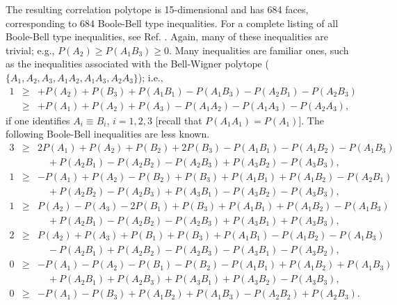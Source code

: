 The resulting correlation polytope is 15-dimensional and has 684 faces,
corresponding to 684 Boole-Bell type inequalities.
For a complete listing of all Boole-Bell type inequalities, see Ref. \cite{pit-svo-list2}.
Again, many of these inequalities are trivial; e.g.,   $P(A_2) \ge P(A_1B_3)  \ge  0$.
Many inequalities are   familiar ones,
such as the inequalities associated with the Bell-Wigner polytope
($\{A_1,A_2,A_3,A_1A_2,A_1A_3,A_2A_3\}$); i.e.,
\begin{eqnarray}
1 &\ge&  + P(A_2) + P(B_3) + P(A_1B_1) - P(A_1B_3) - P(A_2B_1) - P(A_2B_3)\label{e3-3bw}\\
  &\ge&  + P(A_1) + P(A_2) + P(A_3) - P(A_1A_2) - P(A_1A_3)  - P(A_2A_3),\nonumber
\end{eqnarray}
if one identifies $A_i\equiv B_i$, $i=1,2,3$
[recall that $P(A_1A_1)=P(A_1)$].
The following Boole-Bell inequalities are less known.
\begin{eqnarray}
3 & \ge & 2P(A_1) + P(A_2) +P(B_2) +2P(B_3) - P(A_1B_1) - P(A_1B_2) - P(A_1B_3)
\nonumber\\ &&\quad
 + P(A_2B_1) - P(A_2B_2) - P(A_2B_3) + P(A_3B_2) - P(A_3B_3)
,\\
1 & \ge & - P(A_1) + P(A_2) -P(B_2) +P(B_3) + P(A_1B_1) + P(A_1B_2) - P(A_2B_1)
\nonumber\\ &&\quad
 + P(A_2B_2) - P(A_2B_3) + P(A_3B_1) - P(A_3B_2) - P(A_3B_3)
,\\
1 & \ge &  P(A_2) - P(A_3) -2P(B_1) +P(B_3) + P(A_1B_1) + P(A_1B_2) - P(A_1B_3)
\nonumber\\ &&\quad
+ P(A_2B_1) - P(A_2B_2) - P(A_2B_3) + P(A_3B_1) + P(A_3B_3)
,\\
2 & \ge &  P(A_2) + P(A_3) + P(B_1) + P(B_3) + P(A_1B_1) - P(A_1B_2) - P(A_1B_3)
\nonumber\\ &&\quad
- P(A_2B_1) + P(A_2B_2) - P(A_2B_3) - P(A_3B_1) - P(A_3B_2)
,       \label{e3-3c}\\
0 & \ge & - P(A_1) - P(A_2) -P(B_1) -P(B_2) - P(A_1B_1) + P(A_1B_2) + P(A_1B_3)
\nonumber\\ &&\quad
 + P(A_2B_1) + P(A_2B_3) + P(A_3B_1) + P(A_3B_2) - P(A_3B_3)
,\label{e3-3a}\\
0 & \ge & - P(A_1) -P(B_3) + P(A_1B_2) + P(A_1B_3) - P(A_2B_2) + P(A_2B_3)
.       \label{e3-3b}
\end{eqnarray}


